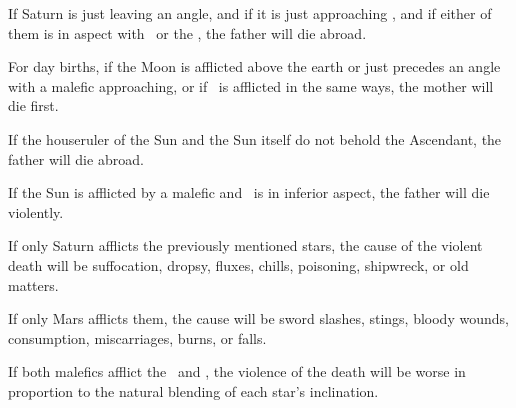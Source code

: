 If Saturn is just leaving an angle, and if it is just approaching \Mars, and if either of them is in aspect with \Jupiter\, or the \Sun, the father will die abroad.

For day births, if the Moon is afflicted above the earth or just precedes an angle with a malefic approaching, or if \Venus\, is afflicted in the same ways, the mother will die first. 

If the houseruler of the Sun and the Sun itself do not behold the Ascendant, the father will die abroad. 

If the Sun is afflicted by a malefic and \Jupiter\, is in inferior aspect, the father will die violently. 

If only Saturn afflicts the previously mentioned stars, the cause of the violent death will be suffocation, dropsy, fluxes, chills, poisoning, shipwreck, or old matters. 

If only Mars afflicts them, the cause will be sword slashes, stings, bloody wounds, consumption, miscarriages, burns, or falls. 

If both malefics afflict the \Sun\, and \Jupiter, the violence of the death will be worse in proportion to the natural blending of each star’s inclination.

\newpage